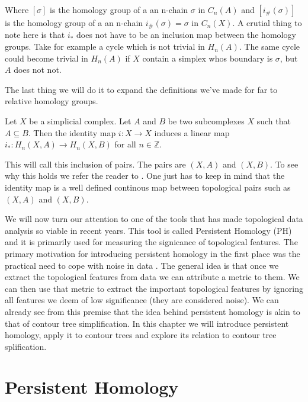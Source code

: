 Where $[\sigma]$ is the homology group of a an n-chain $\sigma$ in $C_n(A)$ and $[i_\#(\sigma)]$ is the homology group of a an n-chain $i_\#(\sigma) = \sigma$ in $C_n(X)$. A crutial thing to note here is that $i_*$ does not have to be an inclusion map between the homology groups. Take for example a cycle which is not trivial in $H_n(A)$. The same cycle could become trivial in $H_n(A)$ if $X$ contain a simplex whos boundary is $\sigma$, but $A$ does not not.

The last thing we will do it to expand the definitions we've made for far to relative homology groups.

\begin{defn} Let $X$ be a simplicial complex. Let $A$ and $B$ be two subcomplexes $X$ such that $A \subseteq B$. Then the identity map $i: X \to X$ induces a linear map $i_*: H_n(X, A) \to H_n(X, B)$ for all $n \in \mathbb{Z}$.
\end{defn}

This will call this inclusion of pairs. The pairs are $(X, A)$ and $(X, B)$. To see why this holds we refer the reader to \cite{algebraic-topology}. One just has to keep in mind that the identity map is a well defined continous map between topological pairs such as $(X, A)$ and $(X, B)$.

We will now turn our attention to one of the tools that has made topological data analysis so viable in recent years. This tool is called Persistent Homology (PH) and it is primarily used for measuring the signicance of topological features. The primary motivation for introducing persistent homology in the first place was the practical need to cope with noise in data \cite{comp-topo}. The general idea is that once we extract the topological features from data we can attribute a metric to them. We can then use that metric to extract the important topological features by ignoring all features we deem of low significance (they are considered noise). We can already see from this premise that the idea behind persistent homology is akin to that of contour tree simplification. In this chapter we will introduce persistent homology, apply it to contour trees and explore its relation to contour tree splification.

\section{Persistent Homology}


